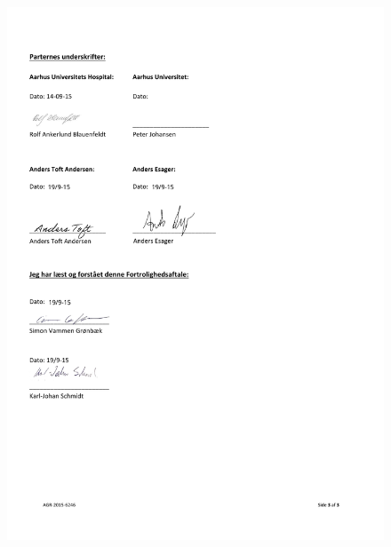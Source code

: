 \begin{figure}[H]
	\includegraphics[width = 1\textwidth]{billeder/FortrolighedsaftaleSide3.pdf}
\end{figure}